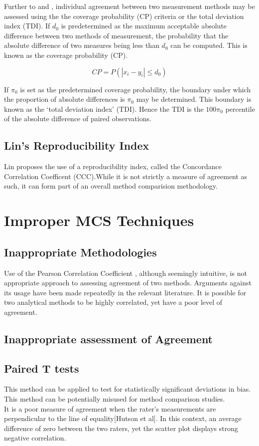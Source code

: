 \documentclass[12pt, a4paper]{report}
\theoremstyle{plain}
\theoremstyle{definition}
\theoremstyle{remark}
\begin{document}
	Further to  \citet{lin2000} and \citet{lin2002}, individual agreement between two measurement methods may be
	assessed using the the coverage probability (CP) criteria or the total deviation index (TDI). If $d_{0}$ is predetermined as the maximum acceptable absolute difference between two methods of measurement, the probability that the absolute difference of two measures being less than $d_{0}$ can be computed. This is known as the coverage probability (CP).
	
	\begin{equation}
	CP = P(|x_{i} - y_{i}| \leq d_{0})
	\end{equation}
	
	If $\pi_{0}$ is set as the predetermined coverage probability, the
	boundary under which the proportion of absolute differences is
	$\pi_{0}$ may be determined. This boundary is known as the `total
	deviation index' (TDI). Hence the TDI is the $100\pi_{0}$
	percentile of the absolute difference of paired observations.
	
	

	\section{Lin's Reproducibility Index} Lin proposes the use of a
	reproducibility index, called the Concordance Correlation
	Coefficent (CCC).While it is not strictly a measure of agreement
	as such, it can form part of an overall method comparision
	methodology.
	\chapter{Improper MCS Techniques}
	
	\section{Inappropriate Methodologies} Use of the Pearson
	Correlation Coefficient , although seemingly intuitive, is not
	appropriate approach to assessing agreement of two methods.
	Arguments against its usage have been made repeatedly in the
	relevant literature. It is possible for two analytical methods to
	be highly correlated, yet have a poor level of agreement.


	\section{Inappropriate assessment of Agreement}
	\section{Paired T tests} This method can be applied to test for
	statistically significant deviations in bias. This method can be
	potentially misused for method comparison studies.
	\\It is a poor measure of agreement when the rater's measurements
	are perpendicular to the line of equality[Hutson et al]. In this
	context, an average difference of zero between the two raters, yet
	the scatter plot displays strong negative correlation.
	
\end{document}
